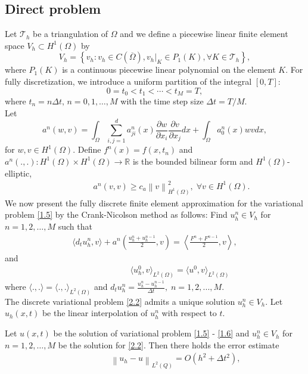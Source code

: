 \documentclass[notitlepage,a4paper,fleqn,9pt]{icmfarticle}
\begin{document}
\begin{multicols}{2}
\section{Direct problem}
Let $\mathcal{T}_h$ be a triangulation of $\Omega$ and we define a piecewise linear finite element space $V_h \subset H^1(\Omega)$ by
$$V_h=\left\{v_h:v_h\in C(\overline{\Omega}), v_h|_K\in P_1(K), \forall K\in \mathcal{T}_h\right\},$$
where $P_1(K)$ is a continuous piecewise linear polynomial on the element $K$. For fully discretization, we introduce a uniform partition of the integral $[0, T]:$
$$0=t_0<t_1<\cdots<t_M=T,$$ 
where $t_n=n\Delta t,\, n=0, 1, \dots, M$  with the time step size $\Delta t = T/M$.
\\
Let 
$$a^n(w, v)=\int_{\Omega}\sum_{i, j=1}^{d}a^n_{ji}(x)\frac{\partial w}{\partial x_i}\frac{\partial v}{\partial x_j}dx+\int_{\Omega}a_0^n(x)wvdx,$$
for $w, v\in H^1(\Omega)$. Define $f^n(x)=f(x, t_n)$ and $a^n(., .): H^1(\Omega)\times H^1(\Omega)\to \mathbb{R}$ is the bounded bilinear form and $H^1(\Omega)$-elliptic,
\begin{align}\label{elliptic}
	\qquad\qquad a^n(v, v)\geq c_a\left\|v\right\|_{H^1(\Omega)}^2, \; \forall v\in H^1(\Omega).
\end{align}
We now present the fully discrete finite element approximation for the variational problem \eqref{1.5} by the Crank-Nicolson method as follows: Find $u^n_h\in V_h$ for $n=1, 2, \dots, M$ such that
\begin{align}\label{2.2}
	\langle d_tu^n_h, v \rangle+a^n\left(\frac{u^n_h+u^{n-1}_h}{2}, v\right)=\left\langle \frac{F^n+F^{n-1}}{2}, v \right\rangle,
\end{align}
and
\begin{align}
	\qquad\qquad\qquad\langle u^0_h, v \rangle_{L^2(\Omega)}=\langle u^0, v \rangle_{L^2(\Omega)}
\end{align}
where $\langle.,.\rangle=\langle.,.\rangle_{L^2(\Omega)}$ and $d_tu^n_h=\frac{u^n_h-u^{n-1}_h}{\Delta t}, \; n=1, 2, ..., M.$
\\
The discrete variational problem \eqref{2.2} admits a unique solution $u^n_h\in V_h$. Let $u_h(x, t)$ be the linear interpolation of $u_h^n$ with respect to $t$. 
\begin{dl}\label{dl2.1}
	Let $u(x, t)$ be the solution of variational problem \eqref{1.5} - \eqref{1.6} and $u^n_h\in V_h$ for $n=1, 2, \dots, M$ be the solution for \eqref{2.2}. Then there holds the error estimate
	\begin{align}\label{2.4}
		\qquad\qquad\quad\left\|u_h-u\right\|_{L^2(Q)}=O\left(h^2+\Delta t^2\right),

\end{align}
\end{dl}
\end{multicols}
\end{document}
